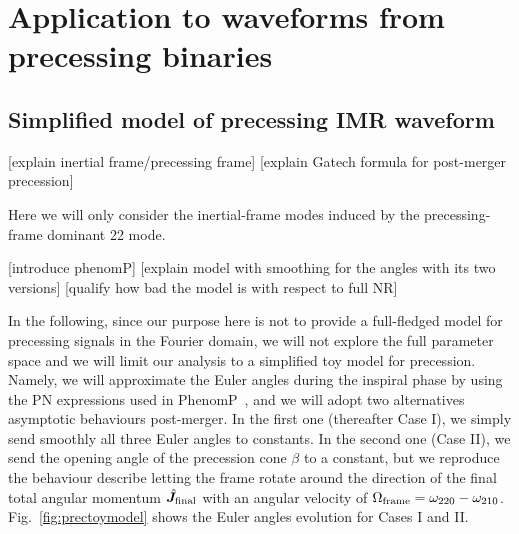 \documentclass[aps,showpacs,%
prd,superscriptaddress,nofootinbib]{revtex4}
\begin{document}

\section{Application to waveforms from precessing binaries}
\label{sec:precession}


\subsection{Simplified model of precessing IMR waveform}
\label{subsec:precmodel}

[explain inertial frame/precessing frame]
[explain Gatech formula for post-merger precession]

Here we will only consider the inertial-frame modes induced by the precessing-frame dominant 22 mode.

[introduce phenomP]
[explain model with smoothing for the angles with its two versions]
[qualify how bad the model is with respect to full NR]

In the following, since our purpose here is not to provide a full-fledged model for precessing signals in the Fourier domain, we will not explore the full parameter space and we will limit our analysis to a simplified toy model for precession. Namely, we will approximate the Euler angles during the inspiral phase by using the PN expressions used in PhenomP~\cite{Hannam+13}, and we will adopt two alternatives asymptotic behaviours post-merger. In the first one (thereafter Case I), we simply send smoothly all three Euler angles to constants. In the second one (Case II), we send the opening angle of the precession cone $\beta$ to a constant, but we reproduce the behaviour describe letting the frame rotate around the direction of the final total angular momentum $\hat{\bm{J}}_{\rm final}$ with an angular velocity of $\Omega_{\rm frame} = \omega_{220} - \omega_{210}$. Fig.~\ref{fig:prectoymodel} shows the Euler angles evolution for Cases I and II.
\end{document}
